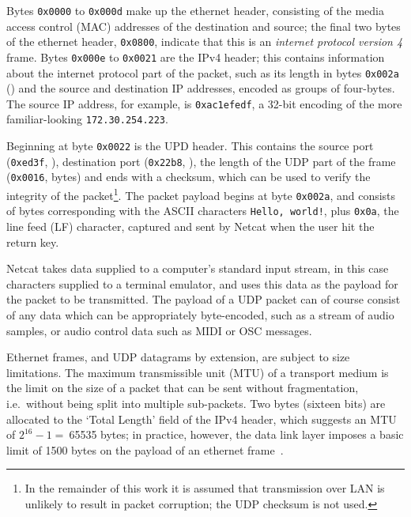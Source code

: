 Bytes \texttt{0x0000} to \texttt{0x000d} make up the ethernet header,
consisting of the media access control (MAC) addresses of the destination and
source; the final two bytes of the ethernet header, \texttt{0x0800}, indicate
that this is an \textit{internet protocol version 4} frame.
Bytes \texttt{0x000e} to \texttt{0x0021} are the IPv4 header; this contains
information about the internet protocol part of the packet, such as its length
in bytes \textemdash{} \texttt{0x002a} () \textemdash{} and
the source and destination IP addresses, encoded as groups of four-bytes.
The source IP address, for example, is \texttt{0xac1efedf}, a 32-bit encoding
of the more familiar-looking \texttt{172.30.254.223}.

Beginning at byte \texttt{0x0022} is the UPD header.
This contains the source port (\texttt{0xed3f}, ), destination
port (\texttt{0x22b8}, ), the length of the UDP part of the frame
(\texttt{0x0016},  bytes) and ends with a checksum, which
can be used to verify the integrity of the packet\footnote{
    In the remainder of this work it is assumed that transmission over LAN is
    unlikely to result in packet corruption; the UDP checksum is not used.
}.
The packet payload begins at byte \texttt{0x002a}, and consists of bytes
corresponding with the ASCII characters \texttt{Hello, world!}, plus
\texttt{0x0a}, the line feed (LF) character, captured and sent by Netcat when
the user hit the return key.

Netcat takes data supplied to a computer's standard input stream, in this
case characters supplied to a terminal emulator, and uses this data as the
payload for the packet to be transmitted.
The payload of a UDP packet can of course consist of any data which can be
appropriately byte-encoded, such as a stream of audio samples, or audio control
data such as MIDI or OSC messages.

Ethernet frames, and UDP datagrams by extension, are subject to size
limitations.
The maximum transmissible unit (MTU) of a transport medium is the limit on the
size of a packet that can be sent without fragmentation, i.e.\ without being
split into multiple sub-packets.
Two bytes (sixteen bits) are allocated to the `Total Length' field of the IPv4
header, which suggests an MTU of $2^{16}-1=~$\num{65535} bytes;
in practice, however, the data link layer imposes a basic limit of \num{1500}
bytes on the payload of an ethernet
frame~\citep{schiavoni_alternatives_2013,ieee_ieee_2018}.
